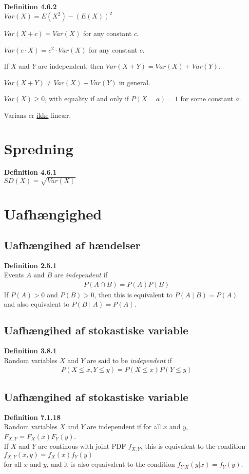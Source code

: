 \documentclass{article}
\begin{document}
\textbf{Definition 4.6.2}\\
$Var(X) = E(X^2) - (E(X))^2$

\begin{itemize*}
  \item $Var(X + c) = Var(X)$ for any constant $c$.
  \item $Var(c \cdot X) = c^2 \cdot Var(X)$ for any constant $c$.
  \item If $X$ and $Y$ are independent, then $Var(X + Y) = Var(X) + Var(Y)$.
  \item $Var(X + Y) \neq Var(X) + Var(Y)$ in general.
  \item $Var(X) \geq 0$, with equality if and only if $P(X =a) = 1$ for some constant $a$.
\end{itemize*}

Varians er \underline{ikke} lineær.
\section*{Spredning}
\textbf{Definition 4.6.1}\\
$SD(X) = \sqrt{Var(X)}$

\section*{Uafhængighed}
\subsection*{Uafhængihed af hændelser}
\textbf{Definition 2.5.1}\\
Events $A$ and $B$ are \textit{independent} if
\begin{align*}
  P(A \cap B) = P(A)P(B)
\end{align*}
If $P(A) > 0$ and $P(B) > 0$, then this is equivalent to $P(A \mid B) = P(A)$ and also equivalent to $P(B \mid A) = P(A)$.

\subsection*{Uafhængihed af stokastiske variable}
\textbf{Definition 3.8.1}\\
Random variables $X$ and $Y$ are said to be \textit{independent} if
\begin{align*}
  P(X \leq x, Y \leq y) = P(X \leq x)P(Y \leq y)
\end{align*}

\subsection*{Uafhængihed af stokastiske variable}
\textbf{Definition 7.1.18}\\
Random variables $X$ and $Y$ are independent if for all $x$ and $y$, $F_{X,Y} = F_{X}(x)F_{Y}(y)$.\\
If $X$ and $Y$ are continous with joint PDF $f_{X,Y}$, this is equivalent to the condition $f_{X,Y}(x,y) = f_X(x)f_Y(y)$\\
for all $x$ and $y$, and it is also equaivalent to the condition $f_{Y | X}(y | x) = f_{Y}(y)$.
\end{document}
